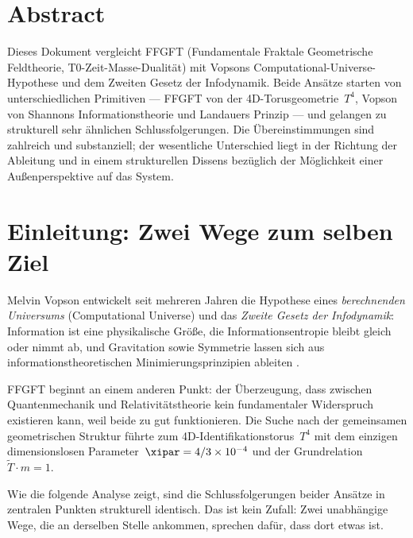 
\section*{Abstract}

Dieses Dokument vergleicht FFGFT (Fundamentale Fraktale Geometrische Feldtheorie,
T0-Zeit-Masse-Dualität) mit Vopsons Computational-Universe-Hypothese und dem
Zweiten Gesetz der Infodynamik. Beide Ansätze starten von unterschiedlichen
Primitiven --- FFGFT von der 4D-Torusgeometrie~$T^4$, Vopson von
Shannons Informationstheorie und Landauers Prinzip --- und
gelangen zu strukturell sehr ähnlichen Schlussfolgerungen. Die Übereinstimmungen
sind zahlreich und substanziell; der wesentliche Unterschied liegt in der
Richtung der Ableitung und in einem strukturellen Dissens bezüglich der
Möglichkeit einer Außenperspektive auf das System.

\tableofcontents
\newpage

\section{Einleitung: Zwei Wege zum selben Ziel}

Melvin Vopson entwickelt seit mehreren Jahren die Hypothese eines
\emph{berechnenden Universums} (Computational Universe) und das
\emph{Zweite Gesetz der Infodynamik}: Information ist eine physikalische Größe,
die Informationsentropie bleibt gleich oder nimmt ab, und Gravitation sowie
Symmetrie lassen sich aus informationstheoretischen Minimierungsprinzipien
ableiten \cite{Vopson2022,Vopson2023,Vopson2024}.

FFGFT beginnt an einem anderen Punkt: der Überzeugung, dass zwischen
Quantenmechanik und Relativitätstheorie kein fundamentaler Widerspruch
existieren kann, weil beide zu gut funktionieren. Die Suche nach der
gemeinsamen geometrischen Struktur führte zum 4D-Identifikationstorus~$T^4$
mit dem einzigen dimensionslosen Parameter~$\xipar = 4/3 \times 10^{-4}$ und
der Grundrelation $\tilde{T} \cdot m = 1$.

Wie die folgende Analyse zeigt, sind die Schlussfolgerungen beider Ansätze in
zentralen Punkten strukturell identisch. Das ist kein Zufall: Zwei unabhängige
Wege, die an derselben Stelle ankommen, sprechen dafür, dass dort etwas ist.

